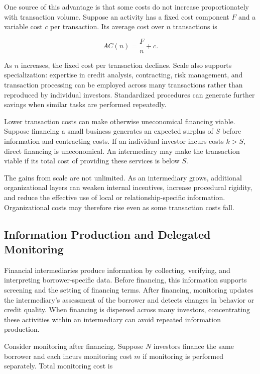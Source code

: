 One source of this advantage is that some costs do not increase proportionately with transaction volume. Suppose an activity has a fixed cost component $F$ and a variable cost $c$ per transaction. Its average cost over $n$ transactions is

\begin{equation}
AC(n)=\frac{F}{n}+c.
\label{eq:ch4-scale-cost}
\end{equation}

As $n$ increases, the fixed cost per transaction declines. Scale also supports specialization: expertise in credit analysis, contracting, risk management, and transaction processing can be employed across many transactions rather than reproduced by individual investors. Standardized procedures can generate further savings when similar tasks are performed repeatedly.

Lower transaction costs can make otherwise uneconomical financing viable. Suppose financing a small business generates an expected surplus of $S$ before information and contracting costs. If an individual investor incurs costs $k>S$, direct financing is uneconomical. An intermediary may make the transaction viable if its total cost of providing these services is below $S$.

The gains from scale are not unlimited. As an intermediary grows, additional organizational layers can weaken internal incentives, increase procedural rigidity, and reduce the effective use of local or relationship-specific information. Organizational costs may therefore rise even as some transaction costs fall.

\subsection{Information Production and Delegated Monitoring}

Financial intermediaries produce information by collecting, verifying, and interpreting borrower-specific data. Before financing, this information supports screening and the setting of financing terms. After financing, monitoring updates the intermediary's assessment of the borrower and detects changes in behavior or credit quality. When financing is dispersed across many investors, concentrating these activities within an intermediary can avoid repeated information production.

Consider monitoring after financing. Suppose $N$ investors finance the same borrower and each incurs monitoring cost $m$ if monitoring is performed separately. Total monitoring cost is

